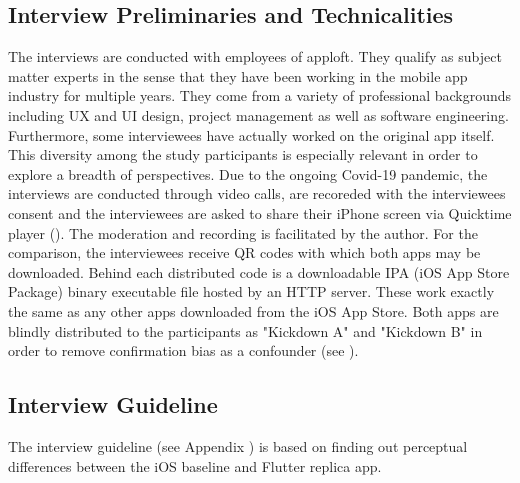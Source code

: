\subsection{Interview Preliminaries and Technicalities}
The interviews are conducted with employees of apploft. They qualify as subject matter experts in the sense that they have been working in the mobile app industry for multiple years. They come from a variety
of professional backgrounds including UX and UI design, project management as well as software engineering. Furthermore, some interviewees have actually worked on the original app itself. This diversity 
among the study participants is especially relevant in order to explore a breadth of perspectives. 
Due to the ongoing Covid-19 pandemic, the interviews are conducted through video calls, are recoreded with the interviewees consent and the interviewees are asked to share their iPhone screen via Quicktime player (\cite{Apple2014}).
The moderation and recording is facilitated by the author.
For the comparison, the interviewees receive QR codes with which both apps may be downloaded. Behind each distributed code is a downloadable IPA (iOS App Store Package) binary executable file hosted by an HTTP server.
These work exactly the same as any other apps downloaded from the iOS App Store.
Both apps are blindly distributed to the participants as "Kickdown A" and "Kickdown B" in order to remove confirmation bias as a confounder (see \cite{Tversky1974}).

\subsection{Interview Guideline} \label{subsection::interview_guideline}
The interview guideline (see Appendix \cite{section::interview_guideline}) is based on finding out perceptual differences between the iOS baseline and Flutter replica app.

